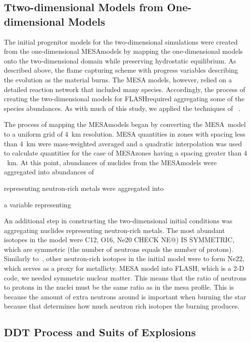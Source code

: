 \documentclass[iop,apj]{emulateapj}
\newcommand{\code}[1]{\textsc{#1}}
\newcommand{\FLASH}{\code{FLASH}}
\newcommand{\MESA}{\code{MESA}}
\begin{document}
\subsection{Ttwo-dimensional Models from One-dimensional Models}

The initial progenitor models for the two-dimensional simulations were
created from the one-dimensional \MESA models by mapping the one-dimensional
models onto the two-dimensional domain while 
preserving hydrostatic equilibrium.
As described above, the flame capturing scheme with progress
variables describing the evolution as the material burns. The \MESA
models, however, relied on a detailed reaction network that included
many species. Accordingly, the process of creating the two-dimensional
models for \FLASH required aggregating some of the species abundances.
As with much of this study, we applied the 
techniques of ~\citet{willcoxetal2016}.


The process of mapping the \MESA models began by converting 
the \MESA\ model to a uniform grid of $4$~km resolution. \MESA 
quantities in zones with spacing less than $4$~km 
were mass-weighted averaged and a quadratic interpolation
was used to calculate quantities for the case of \MESA zones having
a spacing greater than $4$~km. At this point, 
abundances of nuclides from the \MESA models were aggregated
into abundances of 


representing neutron-rich metals were aggregated into

a variable representing 




An additional step in constructing the two-dimensional initial conditions
was aggregating nuclides representing neutron-rich metals. 
The most abundant isotopes in the model were C12, O16,
Ne20 CHECK NE@) IS SYMMETRIC, which are symmetric (the number of neutrons 
equals the number of protons). Similarly to~\citet{willcoxetal2016}, other 
neutron-rich isotopes in
the initial model were to form Ne22, which serves as a proxy for metallicty. 
MESA model into FLASH, which is a 2-D code, we needed symmetric nuclear
matter. This means that the ratio of neutrons to protons in the nuclei
must be the same ratio as in the mesa profile. This is because the amount
of extra neutrons around is important when burning the star because that
determines how much neutron rich isotopes the burning produces.

\subsection{DDT Process and Suits of Explosions}
\end{document}
